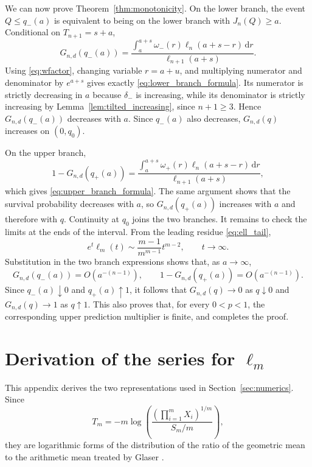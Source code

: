\documentclass[11pt]{article}
\theoremstyle{remark}
\newcommand{\dd}{\,\mathrm d}
\begin{document}
We can now prove Theorem~\ref{thm:monotonicity}. On the lower branch, the event $Q\le q_-(a)$ is equivalent to being on the lower branch with $J_n(Q)\ge a$. Conditional on $T_{n+1}=s+a$,
\begin{equation}
 G_{n,d}(q_-(a))
 =\frac{\displaystyle\int_a^{a+s}\omega_-(r)\ell_n(a+s-r)\dd r}
        {\ell_{n+1}(a+s)}.
 \label{eq:lower_monotone_start}
\end{equation}
Using \eqref{eq:wfactor}, changing variable $r=a+u$, and multiplying numerator and denominator by $e^{a+s}$ gives exactly \eqref{eq:lower_branch_formula}. Its numerator is strictly decreasing in $a$ because $\delta_-$ is increasing, while its denominator is strictly increasing by Lemma~\ref{lem:tilted_increasing}, since $n+1\ge3$. Hence $G_{n,d}(q_-(a))$ decreases with $a$. Since $q_-(a)$ also decreases, $G_{n,d}(q)$ increases on $(0,q_0)$.

On the upper branch,
\begin{equation}
 1-G_{n,d}(q_+(a))
 =\frac{\displaystyle\int_a^{a+s}\omega_+(r)\ell_n(a+s-r)\dd r}
        {\ell_{n+1}(a+s)},
 \label{eq:upper_monotone_start}
\end{equation}
which gives \eqref{eq:upper_branch_formula}. The same argument shows that the survival probability decreases with $a$, so $G_{n,d}(q_+(a))$ increases with $a$ and therefore with $q$. Continuity at $q_0$ joins the two branches. It remains to check the limits at the ends of the interval. From the leading residue \eqref{eq:ell_tail},
\[
 e^t\ell_m(t)\sim \frac{m-1}{m^{m-1}}t^{m-2},
 \qquad t\to\infty.
\]
Substitution in the two branch expressions shows that, as $a\to\infty$,
\[
 G_{n,d}(q_-(a))=O(a^{-(n-1)}),
 \qquad
 1-G_{n,d}(q_+(a))=O(a^{-(n-1)}).
\]
Since $q_-(a)\downarrow0$ and $q_+(a)\uparrow1$, it follows that $G_{n,d}(q)\to0$ as $q\downarrow0$ and $G_{n,d}(q)\to1$ as $q\uparrow1$. This also proves that, for every $0<p<1$, the corresponding upper prediction multiplier is finite, and completes the proof.

\section{Derivation of the series for \texorpdfstring{$\ell_m$}{ell-m}}
\label{app:density_series}

This appendix derives the two representations used in Section~\ref{sec:numerics}. Since
\[
 T_m=-m\log\!\left(
 \frac{(\prod_{i=1}^m X_i)^{1/m}}{S_m/m}
 \right),
\]
they are logarithmic forms of the distribution of the ratio of the geometric mean to the arithmetic mean treated by Glaser \cite{Glaser1976}.
\end{document}
